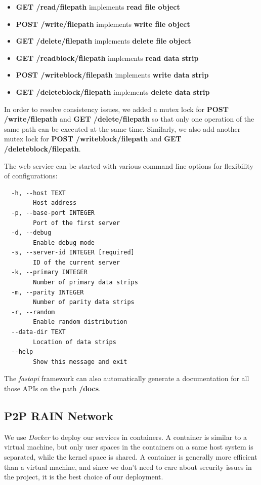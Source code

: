 \documentclass[conference]{IEEEtran}
\begin{document}
\begin{itemize}
    \item \textbf{GET /read/filepath} implements \textbf{read file object}
    \item \textbf{POST /write/filepath} implements \textbf{write file object}
    \item \textbf{GET /delete/filepath} implements \textbf{delete file object}
    \item \textbf{GET /readblock/filepath} implements \textbf{read data strip}
    \item \textbf{POST /writeblock/filepath} implements \textbf{write data strip}
    \item \textbf{GET /deleteblock/filepath} implements \textbf{delete data strip}
\end{itemize}

In order to resolve consistency issues, we added a mutex lock for \textbf{POST /write/filepath} and \textbf{GET /delete/filepath} so that only one operation of the same path can be executed at the same time. Similarly, we also add another mutex lock for \textbf{POST /writeblock/filepath} and \textbf{GET /deleteblock/filepath}. 

The web service can be started with various command line options for flexibility of configurations:

\begin{verbatim}
  -h, --host TEXT          
        Host address
  -p, --base-port INTEGER  
        Port of the first server
  -d, --debug              
        Enable debug mode
  -s, --server-id INTEGER [required]
        ID of the current server 
  -k, --primary INTEGER    
        Number of primary data strips
  -m, --parity INTEGER     
        Number of parity data strips
  -r, --random             
        Enable random distribution
  --data-dir TEXT          
        Location of data strips
  --help                   
        Show this message and exit
\end{verbatim}

The \textit{fastapi} framework can also automatically generate a documentation for all those APIs on the path \textbf{/docs}. 


\subsection{P2P RAIN Network}

We use \textit{Docker} to deploy our services in containers. A container is similar to a virtual machine, but only user spaces in the containers on a same host system is separated, while the kernel space is shared. A container is generally more efficient than a virtual machine, and since we don't need to care about security issues in the project, it is the best choice of our deployment. 
\end{document}
